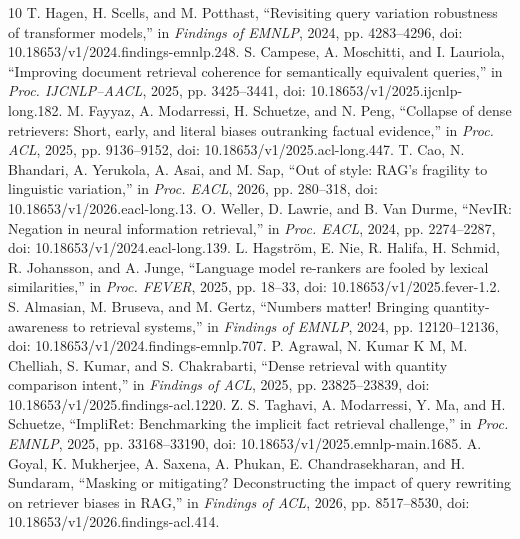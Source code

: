 \begin{thebibliography}{10}
 T. Hagen, H. Scells, and M. Potthast, ``Revisiting query variation robustness of transformer models,'' in \emph{Findings of EMNLP}, 2024, pp. 4283--4296, doi: 10.18653/v1/2024.findings-emnlp.248.
 S. Campese, A. Moschitti, and I. Lauriola, ``Improving document retrieval coherence for semantically equivalent queries,'' in \emph{Proc. IJCNLP--AACL}, 2025, pp. 3425--3441, doi: 10.18653/v1/2025.ijcnlp-long.182.
 M. Fayyaz, A. Modarressi, H. Schuetze, and N. Peng, ``Collapse of dense retrievers: Short, early, and literal biases outranking factual evidence,'' in \emph{Proc. ACL}, 2025, pp. 9136--9152, doi: 10.18653/v1/2025.acl-long.447.
 T. Cao, N. Bhandari, A. Yerukola, A. Asai, and M. Sap, ``Out of style: RAG's fragility to linguistic variation,'' in \emph{Proc. EACL}, 2026, pp. 280--318, doi: 10.18653/v1/2026.eacl-long.13.
 O. Weller, D. Lawrie, and B. Van Durme, ``NevIR: Negation in neural information retrieval,'' in \emph{Proc. EACL}, 2024, pp. 2274--2287, doi: 10.18653/v1/2024.eacl-long.139.
 L. Hagstr\"om, E. Nie, R. Halifa, H. Schmid, R. Johansson, and A. Junge, ``Language model re-rankers are fooled by lexical similarities,'' in \emph{Proc. FEVER}, 2025, pp. 18--33, doi: 10.18653/v1/2025.fever-1.2.
 S. Almasian, M. Bruseva, and M. Gertz, ``Numbers matter! Bringing quantity-awareness to retrieval systems,'' in \emph{Findings of EMNLP}, 2024, pp. 12120--12136, doi: 10.18653/v1/2024.findings-emnlp.707.
 P. Agrawal, N. Kumar K M, M. Chelliah, S. Kumar, and S. Chakrabarti, ``Dense retrieval with quantity comparison intent,'' in \emph{Findings of ACL}, 2025, pp. 23825--23839, doi: 10.18653/v1/2025.findings-acl.1220.
 Z. S. Taghavi, A. Modarressi, Y. Ma, and H. Schuetze, ``ImpliRet: Benchmarking the implicit fact retrieval challenge,'' in \emph{Proc. EMNLP}, 2025, pp. 33168--33190, doi: 10.18653/v1/2025.emnlp-main.1685.
 A. Goyal, K. Mukherjee, A. Saxena, A. Phukan, E. Chandrasekharan, and H. Sundaram, ``Masking or mitigating? Deconstructing the impact of query rewriting on retriever biases in RAG,'' in \emph{Findings of ACL}, 2026, pp. 8517--8530, doi: 10.18653/v1/2026.findings-acl.414.
\end{thebibliography}
